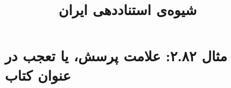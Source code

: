 \documentclass[a4paper,10pt]{article}
\begin{document}
\title{شیوه‌ی استناددهی ایران
 }
\author{}
\date{}
\maketitle



\section*{مثال ۲.۸۲: علامت پرسش، یا تعجب در عنوان کتاب}

\cite{فرزامنیا1370}\\
\cite{aaron1973}\\






\end{document}
